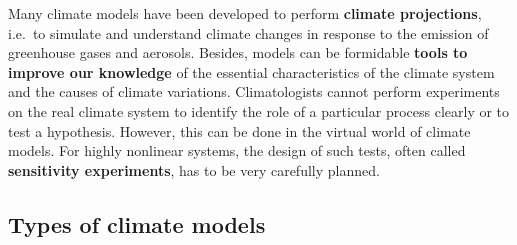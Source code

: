 \documentclass[12pt,oneside]{book}
\begin{document}
Many climate models have been developed to perform \textbf{climate
projections}, i.e.~to simulate and understand climate changes in
response to the emission of greenhouse gases and aerosols. Besides,
models can be formidable \textbf{tools to improve our knowledge} of the
essential characteristics of the climate system and the causes of
climate variations. Climatologists cannot perform experiments on the
real climate system to identify the role of a particular process clearly
or to test a hypothesis. However, this can be done in the virtual world
of climate models. For highly nonlinear systems, the design of such
tests, often called \textbf{sensitivity experiments}, has to be very
carefully planned.

\subsection{Types of climate models}\label{types-of-climate-models}
\end{document}
